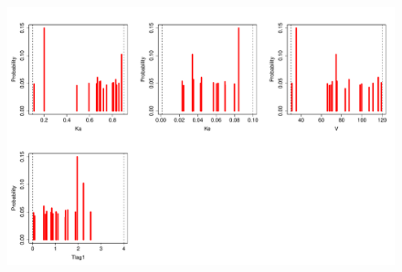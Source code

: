 \documentclass{article}
\begin{document}
\begin{figure}[H] 
          \includegraphics[height=4.5in,width=8in]{final.pdf}
          \end{figure} 
              
          \hypertarget{suppoint}{}
          
\end{document}

